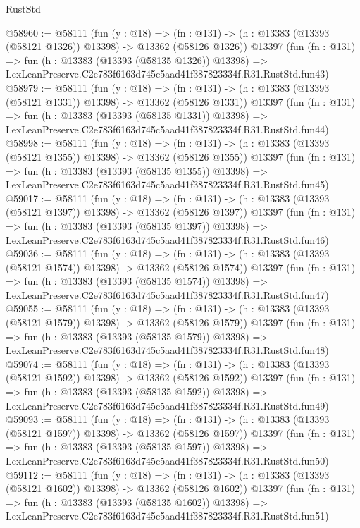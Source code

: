 \begin{lexlean}{RustStd}
\begin{coremodule}
@58960 := @58111
    (fun (y : @18) =>
    (fn : @131) -> (h : @13383 (@13393 (@58121 @1326)) @13398) -> @13362 (@58126 @1326))
    @13397
    (fun (fn : @131) =>
    fun (h : @13383 (@13393 (@58135 @1326)) @13398) =>
    LexLeanPreserve.C2e783f6163d745c5aad41f387823334f.R31.RustStd.fun43)
@58979 := @58111
    (fun (y : @18) =>
    (fn : @131) -> (h : @13383 (@13393 (@58121 @1331)) @13398) -> @13362 (@58126 @1331))
    @13397
    (fun (fn : @131) =>
    fun (h : @13383 (@13393 (@58135 @1331)) @13398) =>
    LexLeanPreserve.C2e783f6163d745c5aad41f387823334f.R31.RustStd.fun44)
@58998 := @58111
    (fun (y : @18) =>
    (fn : @131) -> (h : @13383 (@13393 (@58121 @1355)) @13398) -> @13362 (@58126 @1355))
    @13397
    (fun (fn : @131) =>
    fun (h : @13383 (@13393 (@58135 @1355)) @13398) =>
    LexLeanPreserve.C2e783f6163d745c5aad41f387823334f.R31.RustStd.fun45)
@59017 := @58111
    (fun (y : @18) =>
    (fn : @131) -> (h : @13383 (@13393 (@58121 @1397)) @13398) -> @13362 (@58126 @1397))
    @13397
    (fun (fn : @131) =>
    fun (h : @13383 (@13393 (@58135 @1397)) @13398) =>
    LexLeanPreserve.C2e783f6163d745c5aad41f387823334f.R31.RustStd.fun46)
@59036 := @58111
    (fun (y : @18) =>
    (fn : @131) -> (h : @13383 (@13393 (@58121 @1574)) @13398) -> @13362 (@58126 @1574))
    @13397
    (fun (fn : @131) =>
    fun (h : @13383 (@13393 (@58135 @1574)) @13398) =>
    LexLeanPreserve.C2e783f6163d745c5aad41f387823334f.R31.RustStd.fun47)
@59055 := @58111
    (fun (y : @18) =>
    (fn : @131) -> (h : @13383 (@13393 (@58121 @1579)) @13398) -> @13362 (@58126 @1579))
    @13397
    (fun (fn : @131) =>
    fun (h : @13383 (@13393 (@58135 @1579)) @13398) =>
    LexLeanPreserve.C2e783f6163d745c5aad41f387823334f.R31.RustStd.fun48)
@59074 := @58111
    (fun (y : @18) =>
    (fn : @131) -> (h : @13383 (@13393 (@58121 @1592)) @13398) -> @13362 (@58126 @1592))
    @13397
    (fun (fn : @131) =>
    fun (h : @13383 (@13393 (@58135 @1592)) @13398) =>
    LexLeanPreserve.C2e783f6163d745c5aad41f387823334f.R31.RustStd.fun49)
@59093 := @58111
    (fun (y : @18) =>
    (fn : @131) -> (h : @13383 (@13393 (@58121 @1597)) @13398) -> @13362 (@58126 @1597))
    @13397
    (fun (fn : @131) =>
    fun (h : @13383 (@13393 (@58135 @1597)) @13398) =>
    LexLeanPreserve.C2e783f6163d745c5aad41f387823334f.R31.RustStd.fun50)
@59112 := @58111
    (fun (y : @18) =>
    (fn : @131) -> (h : @13383 (@13393 (@58121 @1602)) @13398) -> @13362 (@58126 @1602))
    @13397
    (fun (fn : @131) =>
    fun (h : @13383 (@13393 (@58135 @1602)) @13398) =>
    LexLeanPreserve.C2e783f6163d745c5aad41f387823334f.R31.RustStd.fun51)

\end{coremodule}
\end{lexlean}
